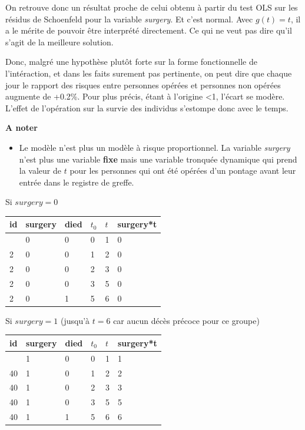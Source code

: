 \documentclass[
  12pt,
  letterpaper,
  DIV=11,
  numbers=noendperiod,
  onepage,
  openany]{scrreprt}
\providecommand{\tightlist}{%
  \setlength{\itemsep}{0pt}\setlength{\parskip}{0pt}}\usepackage{longtable,booktabs,array}
\begin{document}
On retrouve donc un résultat proche de celui obtenu à partir du test OLS
sur les résidus de Schoenfeld pour la variable \emph{surgery}. Et c'est
normal. Avec \(g(t)=t\), il a le mérite de pouvoir être interprété
directement. Ce qui ne veut pas dire qu'il s'agit de la meilleure
solution.

Donc, malgré une hypothèse plutôt forte sur la forme fonctionnelle de
l'intéraction, et dans les faits surement pas pertinente, on peut dire
que chaque jour le rapport des risques entre personnes opérées et
personnes non opérées augmente de +0.2\%. Pour plus précis, étant à
l'origine \textless1, l'écart se modère. L'effet de l'opération sur la
survie des individus s'estompe donc avec le temps.

\textbf{A noter}

\begin{itemize}
\tightlist
\item
  Le modèle n'est plus un modèle à risque proportionnel. La variable
  \emph{surgery} n'est plus une variable \textbf{fixe} mais une variable
  tronquée dynamique qui prend la valeur de \(t\) pour les personnes qui
  ont été opérées d'un pontage avant leur entrée dans le registre de
  greffe.
\end{itemize}

Si \(surgery = 0\)

\begin{longtable}[]{@{}llllll@{}}
\toprule\noalign{}
id & surgery & died & \(t_0\) & \(t\) & surgery*t \\
\midrule\noalign{}
\endhead
\bottomrule\noalign{}
\endlastfoot
2 & 0 & 0 & 0 & 1 & 0 \\
2 & 0 & 0 & 1 & 2 & 0 \\
2 & 0 & 0 & 2 & 3 & 0 \\
2 & 0 & 0 & 3 & 5 & 0 \\
2 & 0 & 1 & 5 & 6 & 0 \\
\end{longtable}

Si \(surgery = 1\) (jusqu'à \(t=6\) car aucun décès précoce pour ce
groupe)

\begin{longtable}[]{@{}llllll@{}}
\toprule\noalign{}
id & surgery & died & \(t_0\) & \(t\) & surgery*t \\
\midrule\noalign{}
\endhead
\bottomrule\noalign{}
\endlastfoot
40 & 1 & 0 & 0 & 1 & 1 \\
40 & 1 & 0 & 1 & 2 & 2 \\
40 & 1 & 0 & 2 & 3 & 3 \\
40 & 1 & 0 & 3 & 5 & 5 \\
40 & 1 & 1 & 5 & 6 & 6 \\
\end{longtable}
\end{document}
